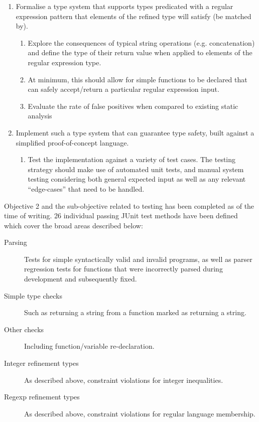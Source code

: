 \documentclass[a4paper]{article}
\begin{document}
\begin{enumerate}
    \item Formalise a type system that supports types predicated with a regular expression pattern that elements of the refined type will satisfy (be matched by).
    \begin{enumerate}
        \item Explore the consequences of typical string operations (e.g. concatenation) and define the type of
        their return value when applied to elements of the regular expression type.

        \item At minimum, this should allow for simple functions to be declared that can safely accept/return a
        particular regular expression input.
        \item Evaluate the rate of false positives when compared to existing static analysis
    \end{enumerate}
    \item Implement such a type system that can guarantee type safety, built against a simplified proof-of-concept
    language.
    \begin{enumerate}
        \item Test the implementation against a variety of test cases. The testing strategy should make use of
        automated unit tests, and manual system testing considering both general expected input as well as
        any relevant ``edge-cases'' that need to be handled.
    \end{enumerate}
\end{enumerate}

Objective 2 and the sub-objective related to testing has been completed as of the time of writing. 26 individual passing JUnit test methods have been defined which cover the broad areas described below:

\begin{description}
    \item[Parsing] Tests for simple syntactically valid and invalid programs, as well as parser regression tests for functions that were incorrectly parsed during development and subsequently fixed.
    \item[Simple type checks] Such as returning a string from a function marked as returning a string.
    \item[Other checks] Including function/variable re-declaration.
    \item[Integer refinement types] As described above, constraint violations for integer inequalities.
    \item[Regexp refinement types] As described above, constraint violations for regular language membership.
\end{description}
\end{document}
